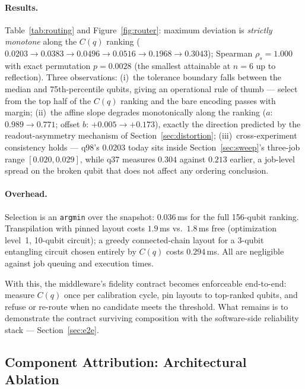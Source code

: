 ﻿\documentclass[12pt,a4paper]{article}
\begin{document}
\paragraph{Results.} Table~\ref{tab:routing} and Figure~\ref{fig:router}: maximum deviation is \emph{strictly monotone} along the $C(q)$ ranking ($0.0203 \to 0.0383 \to 0.0496 \to 0.0516 \to 0.1968 \to 0.3043$); Spearman $\rho_s = 1.000$ with exact permutation $p = 0.0028$ (the smallest attainable at $n{=}6$ up to reflection). Three observations: (i)~the tolerance boundary falls between the median and 75th-percentile qubits, giving an operational rule of thumb --- select from the top half of the $C(q)$ ranking and the bare encoding passes with margin; (ii)~the affine slope degrades monotonically along the ranking ($a$: $0.989 \to 0.771$; offset $b$: $+0.005 \to +0.173$), exactly the direction predicted by the readout-asymmetry mechanism of Section~\ref{sec:distortion}; (iii)~cross-experiment consistency holds --- q98's $0.0203$ today sits inside Section~\ref{sec:sweep}'s three-job range $[0.020, 0.029]$, while q37 measures $0.304$ against $0.213$ earlier, a job-level spread on the broken qubit that does not affect any ordering conclusion.

\paragraph{Overhead.} Selection is an \texttt{argmin} over the snapshot: $0.036$\,ms for the full 156-qubit ranking. Transpilation with pinned layout costs $1.9$\,ms vs.\ $1.8$\,ms free (optimization level~1, 10-qubit circuit); a greedy connected-chain layout for a 3-qubit entangling circuit chosen entirely by $C(q)$ costs $0.294$\,ms. All are negligible against job queuing and execution times.

With this, the middleware's fidelity contract becomes enforceable end-to-end: measure $C(q)$ once per calibration cycle, pin layouts to top-ranked qubits, and refuse or re-route when no candidate meets the threshold. What remains is to demonstrate the contract surviving composition with the software-side reliability stack --- Section~\ref{sec:e2e}.

\subsection{Component Attribution: Architectural Ablation}\label{sec:ablation}
\end{document}
